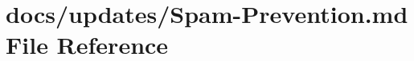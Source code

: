 \hypertarget{_spam-_prevention_8md}{\section{docs/updates/\+Spam-\/\+Prevention.md File Reference}
\label{_spam-_prevention_8md}
}
